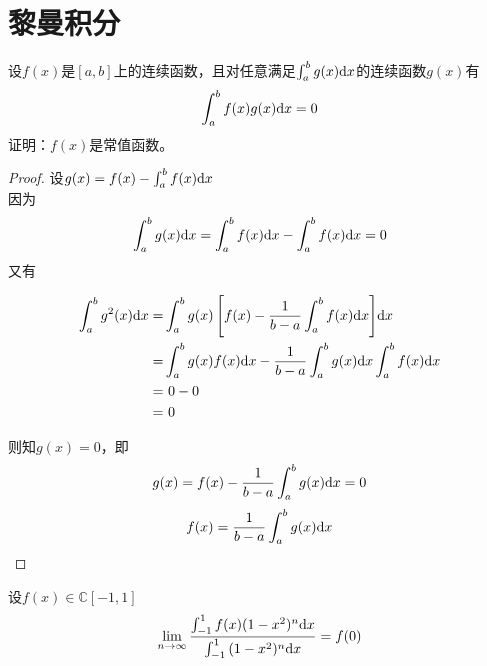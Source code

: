 \section{黎曼积分}

\begin{proposition}
    
    设$f(x)$是$[a, b]$上的连续函数，且对任意满足$\int_{a}^{b}{g(x)}\mathrm{d} x$的连续函数$g(x)$有
    \[\int_{a}^{b}{f(x)g(x)}\mathrm{d} x = 0\]
    证明：$f(x)$是常值函数。

\end{proposition}

\begin{proof}

    设$g(x) = f(x) - \int_{a}^{b}{f(x)}\mathrm{d} x$ \\
    因为
    \[\int_{a}^{b}{g(x)}\mathrm{d} x = \int_{a}^{b}{f(x)}\mathrm{d} x - \int_{a}^{b}{f(x)}\mathrm{d} x = 0\]
    又有
    
    \begin{align*}
        \int_{a}^{b}{g^2(x)}\mathrm{d} x = & \int_{a}^{b}{g(x)\left[ f(x) - \dfrac{1}{b - a} \int_{a}^{b}{f(x)}\mathrm{d} x \right]}\mathrm{d} x \\
        = & \int_{a}^{b}{g(x)f(x)}\mathrm{d} x - \dfrac{1}{b - a} \int_{a}^{b}{g(x)}\mathrm{d} x \int_{a}^{b}{f(x)}\mathrm{d} x \\
        = & \ 0 - 0 \\
        = & \  0
    \end{align*}
    
    则知$g(x) = 0$，即
    \[g(x) = f(x) - \dfrac{1}{b - a} \int_{a}^{b}{g(x)}\mathrm{d} x = 0\]
    \[f(x) = \dfrac{1}{b - a} \int_{a}^{b}{g(x)}\mathrm{d} x \]

\end{proof}

\begin{proposition}

    设$f(x) \in \mathbb{C}[-1, 1]$
    \[\lim\limits_{n \to \infty}{\dfrac{\int_{-1}^{1}{f(x)(1 - x^2)^n}\mathrm{d} x}{\int_{-1}^{1}{(1 - x^2)^n}\mathrm{d} x}} = f(0)\]

\end{proposition}


